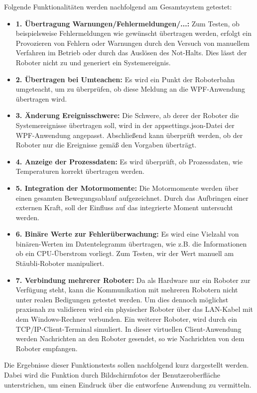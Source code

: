 \documentclass[ a4paper,
                oneside,
                toc=bibliography,
                toc=listof
                ]{scrbook}
\begin{document}
   	\noindent
   	Folgende Funktionalitäten werden nachfolgend am Gesamtsystem getestet:\\
   	\begin{itemize}
   		\item \textbf{1. Übertragung Warnungen/Fehlermeldungen/...:} Zum Testen, ob beispielsweise Fehlermeldungen wie gewünscht übertragen werden, erfolgt ein Provozieren von Fehlern oder Warnungen durch den Versuch von manuellem Verfahren im Betrieb oder durch das Auslösen des Not-Halts. Dies lässt der Roboter nicht zu und generiert ein Systemereignis.
   		\item \textbf{2. Übertragen bei Umteachen:} Es wird ein Punkt der Roboterbahn umgeteacht, um zu überprüfen, ob diese Meldung an die WPF-Anwendung übertragen wird.
   		\item \textbf{3. Änderung Ereignisschwere:} Die Schwere, ab derer der Roboter die Systemereignisse übertragen soll, wird in der appsettings.json-Datei der WPF-Anwendung angepasst. Abschließend kann überprüft werden, ob der Roboter nur die Ereignisse gemäß den Vorgaben überträgt.
   		\item \textbf{4. Anzeige der Prozessdaten:} Es wird überprüft, ob Prozessdaten, wie Temperaturen korrekt übertragen werden.
   		\item \textbf{5. Integration der Motormomente:} Die Motormomente werden über einen gesamten Bewegungsablauf aufgezeichnet. Durch das Aufbringen einer externen Kraft, soll der Einfluss auf das integrierte Moment untersucht werden.
   		\item \textbf{6. Binäre Werte zur Fehlerüberwachung: } Es wird eine Vielzahl von binären-Werten im Datentelegramm übertragen, wie z.B. die Informationen ob ein CPU-Überstrom vorliegt. Zum Testen, wir der Wert manuell am Stäubli-Roboter manipuliert.
   		\item \textbf{7. Verbindung mehrerer Roboter: } Da als Hardware nur ein Roboter zur Verfügung steht, kann die Kommunikation mit mehreren Robotern nicht unter realen Bedigungen getestet werden. Um dies dennoch möglichst praxisnah zu validieren wird ein physischer Roboter über das LAN-Kabel mit dem Windows-Rechner verbunden. Ein weiterer Roboter, wird durch ein TCP/IP-Client-Terminal simuliert. In dieser virtuellen Client-Anwendung werden Nachrichten an den Roboter gesendet, so wie Nachrichten von dem Roboter empfangen.
   	\end{itemize}
   	Die Ergebnisse dieser Funktionstests sollen nachfolgend kurz dargestellt werden. Dabei wird die Funktion durch Bildschirmfotos der Benutzeroberfläche unterstrichen, um einen Eindruck über die entworfene Anwendung zu vermitteln.\vspace{0.5\baselineskip}\\
\end{document}
